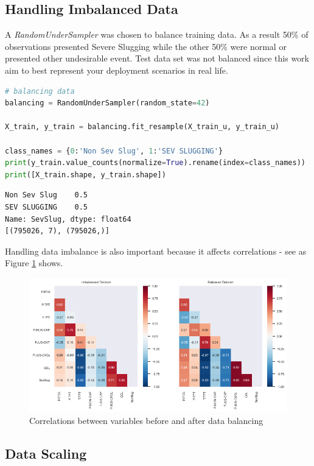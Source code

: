 \documentclass{article}
\begin{document}
\subsection{Handling Imbalanced Data}

A \emph{RandomUnderSampler} was chosen to balance training data. As a result 50\% of observations presented Severe Slugging while the other 50\% were normal or presented other undesirable event. Test data set was not balanced since this work aim to best represent your deployment scenarios in real life.

\begin{lstlisting}[language=Python]
# balancing data 
balancing = RandomUnderSampler(random_state=42)

X_train, y_train = balancing.fit_resample(X_train_u, y_train_u)

class_names = {0:'Non Sev Slug', 1:'SEV SLUGGING'}
print(y_train.value_counts(normalize=True).rename(index=class_names))
print([X_train.shape, y_train.shape])
\end{lstlisting}
\begin{verbatim}
Non Sev Slug    0.5
SEV SLUGGING    0.5
Name: SevSlug, dtype: float64
[(795026, 7), (795026,)]
\end{verbatim}

Handling data imbalance is also important because it affects correlations - see as Figure \ref{fig:correlations} shows.

\begin{figure}
\centering
\includegraphics[width=1\textwidth]{correlations.png}
\caption{\label{fig:correlations}Correlations between variables before and after data balancing}
\end{figure}

\subsection{Data Scaling}
\end{document}
